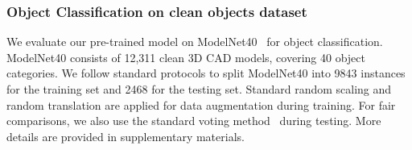 \documentclass[runningheads]{llncs}
\begin{document}
\vspace{-5mm}

\subsubsection{Object Classification on clean objects dataset}
We evaluate our pre-trained model on ModelNet40~\cite{modelnet} for object classification. ModelNet40 consists of 12,311 clean 3D CAD models, covering 40 object categories. We follow standard protocols to split ModelNet40 into 9843 instances for the training set and 2468 for the testing set. Standard random scaling and random translation are applied for data augmentation during training. For fair comparisons, we also use the standard voting method~\cite{ptrscnn} during testing. More details are provided in supplementary materials.
\end{document}
